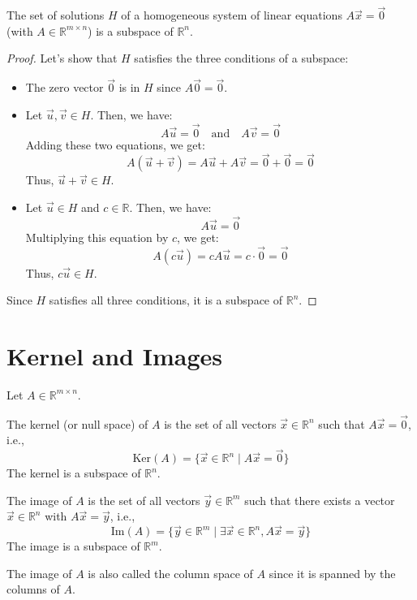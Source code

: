 \begin{theorem}
    The set of solutions $H$ of a homogeneous system of linear equations $A\vec{x} = \vec{0}$ (with $A \in \mathbb{R}^{m \times n}$) is a subspace of $\mathbb{R}^n$.
\end{theorem}
\begin{proof}
    Let's show that $H$ satisfies the three conditions of a subspace:
    \begin{itemize}[itemsep=1pt,label=$\circ$]
        \item The zero vector $\vec{0}$ is in $H$ since $A\vec{0} = \vec{0}$.
        \item Let $\vec{u}, \vec{v} \in H$. Then, we have:
        \[ A\vec{u} = \vec{0} \quad \text{and} \quad A\vec{v} = \vec{0} \]
        Adding these two equations, we get:
        \[ A(\vec{u} + \vec{v}) = A\vec{u} + A\vec{v} = \vec{0} + \vec{0} = \vec{0} \]
        Thus, $\vec{u} + \vec{v} \in H$.
        \item Let $\vec{u} \in H$ and $c \in \mathbb{R}$. Then, we have:
        \[ A\vec{u} = \vec{0} \]
        Multiplying this equation by $c$, we get:
        \[ A(c\vec{u}) = cA\vec{u} = c\cdot\vec{0} = \vec{0} \]
        Thus, $c\vec{u} \in H$.
    \end{itemize}
    Since $H$ satisfies all three conditions, it is a subspace of $\mathbb{R}^n$.
\end{proof}

\section{Kernel and Images}
Let $A \in \mathbb{R}^{m \times n}$.
\begin{definition}[Kernel]
    The kernel (or null space) of $A$ is the set of all vectors $\vec{x} \in \mathbb{R}^n$ such that $A\vec{x} = \vec{0}$, i.e.,
    \[ \text{Ker}(A) = \{ \vec{x} \in \mathbb{R}^n \mid A\vec{x} = \vec{0} \} \]
    The kernel is a subspace of $\mathbb{R}^n$.
\end{definition}

\begin{definition}[Image]
    The image of $A$ is the set of all vectors $\vec{y} \in \mathbb{R}^m$ such that there exists a vector $\vec{x} \in \mathbb{R}^n$ with $A\vec{x} = \vec{y}$, i.e.,
    \[ \text{Im}(A) = \{ \vec{y} \in \mathbb{R}^m \mid \exists \vec{x} \in \mathbb{R}^n, A\vec{x} = \vec{y} \} \]
    The image is a subspace of $\mathbb{R}^m$.
\end{definition}
The image of $A$ is also called the column space of $A$ since it is spanned by the columns of $A$.

